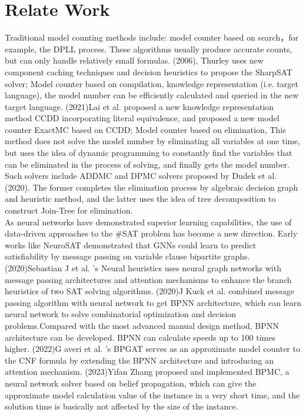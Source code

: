 \section{Relate Work}
Traditional model counting methods include: model counter based on search，for example, the DPLL process. These algorithms usually produce accurate counts, but can only handle relatively small formulas. (2006), Thurley uses new component caching techniques and decision heuristics to propose the SharpSAT solver\cite{B9}; Model counter based on compilation, knowledge representation (i.e. target language), the model number can be efficiently calculated and queried in the new target language.  (2021)Lai et al. proposed a new knowledge representation method CCDD\cite{A21} incorporating literal equivalence, and proposed a new model counter ExactMC\cite{A22} based on CCDD; Model counter based on elimination, This method does not solve the model number by eliminating all variables at one time, but uses the idea of dynamic programming to constantly find the variables that can be eliminated in the process of solving, and finally gets the model number. Such solvers include ADDMC\cite{A20} and DPMC\cite{A23} solvers proposed by Dudek et al. (2020). The former completes the elimination process by algebraic decision graph and heuristic method, and the latter uses the idea of tree decomposition to construct Join-Tree for elimination.\\
As neural networks have demonstrated superior learning capabilities, the use of data-driven approaches to the \#SAT problem has become a new direction. Early works like NeuroSAT\cite{A24} demonstrated that GNNs could learn to predict satisfiability by message passing on  variable clause bipartite graphs. (2020)Sebastian J et al. 's Neural heuristics\cite{A25} uses neural graph networks with message passing architectures and attention mechanisms to enhance the branch heuristics of two SAT solving algorithms. (2020)J Kuck et al. combined message passing algorithm with neural network to get BPNN architecture, which can learn neural network to solve combinatorial optimization and decision problems.Compared with the most advanced manual design method, BPNN architecture can be developed. BPNN can calculate speeds up to 100 times higher. (2022)G averi et al. 's BPGAT\cite{A26} serves as an approximate model counter to the CNF formula by extending the BPNN architecture and introducing an attention mechanism. (2023)Yifan Zhang proposed and implemented BPMC\cite{M1}, a neural network solver based on belief propagation, which can give the approximate model calculation value of the instance in a very short time, and the solution time is basically not affected by the size of the instance.